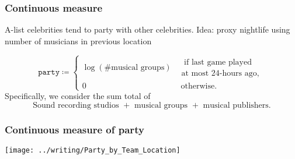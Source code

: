 \documentclass{beamer}
\begin{document}
\begin{frame}   \frametitle{Continuous measure}
  \begin{block}{A-list celebrities tend to party with other celebrities.}     Idea: proxy nightlife using number of musicians in previous location

    \[
      \texttt{party} \coloneqq \begin{cases}       \log \left(\# \textrm{musical groups}\right) &\substack{\textrm{ if last game played} \\ \textrm{at most 24-hours ago,}} \\
      0 &\textrm{ otherwise.}
    \end{cases}
    \]
    \newline
    Specifically, we consider the sum total of
    \[
      \textrm{Sound recording studios } + \textrm{ musical groups } + \textrm{ musical publishers}.
    \]   \end{block} \end{frame}

\begin{frame}   
  \frametitle{Continuous measure of party}
  \centering \texttt{[image: ../writing/Party\_by\_Team\_Location]} 
\end{frame}
\end{document}

